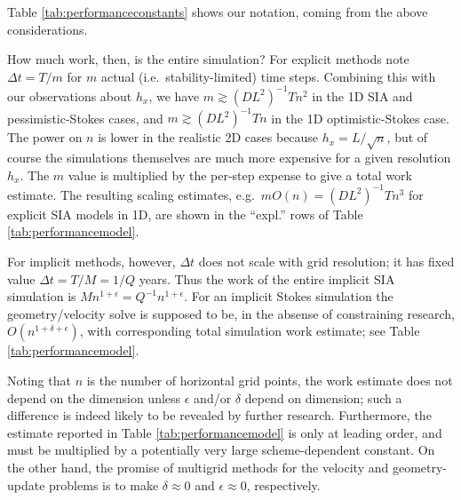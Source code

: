\documentclass[twocolumn,letterpaper]{igs}
\newcommand\eps{\epsilon}
\begin{document}
Table \ref{tab:performanceconstants} shows our notation, coming from the above considerations.

How much work, then, is the entire simulation?  For explicit methods note $\Delta t = T/m$ for $m$ actual (i.e.~stability-limited) time steps.  Combining this with our observations about $h_x$, we have $m \gtrsim (DL^2)^{-1} T n^2$ in the 1D SIA and pessimistic-Stokes cases, and $m \gtrsim (DL^2)^{-1} T n$ in the 1D optimistic-Stokes case.  The power on $n$ is lower in the realistic 2D cases because $h_x = L/\sqrt{n}$, but of course the simulations themselves are much more expensive for a given resolution $h_x$.  The $m$ value is multiplied by the per-step expense to give a total work estimate.  The resulting scaling estimates, e.g.~$m O(n) = (DL^2)^{-1} T n^3$ for explicit SIA models in 1D, are shown in the ``expl.'' rows of Table \ref{tab:performancemodel}.

For implicit methods, however, $\Delta t$ does not scale with grid resolution; it has fixed value $\Delta t = T / M = 1/Q$ years.  Thus the work of the entire implicit SIA simulation is $M n^{1+\eps} = Q^{-1} n^{1+\eps}$.  For an implicit Stokes simulation the geometry/velocity solve is supposed to be, in the absense of constraining research, $O(n^{1+\delta+\eps})$, with corresponding total simulation work estimate; see Table \ref{tab:performancemodel}.

Noting that $n$ is the number of horizontal grid points, the work estimate does not depend on the dimension unless $\eps$ and/or $\delta$ depend on dimension; such a difference is indeed likely to be revealed by further research.  Furthermore, the estimate reported in Table \ref{tab:performancemodel} is only at leading order, and must be multiplied by a potentially very large scheme-dependent constant.  On the other hand, the promise of multigrid methods for the velocity and geometry-update problems is to make $\delta \approx 0$ and $\eps \approx 0$, respectively.
\end{document}
